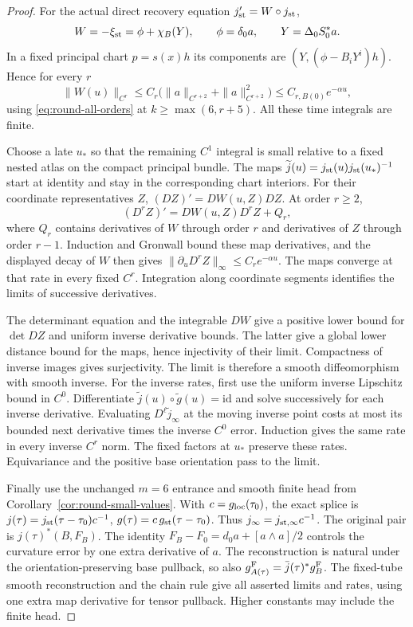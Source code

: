 \documentclass[11pt]{article}
\numberwithin{equation}{section}
\theoremstyle{definition}
\theoremstyle{remark}
\begin{document}
\begin{proof}
For the actual direct recovery equation
$j_{\rm st}'=W\circ j_{\rm st}$,
\[
 W=-\xi_{\rm st}=\phi+\chi_B(Y),\qquad
 \phi=\delta_0a,\qquad Y=\Delta_0S_0^*a.
\]
In a fixed principal chart $p=s(x)h$ its components are
$(Y,(\phi-B_iY^i)h)$. Hence for every $r$
\[
 \|W(u)\|_{C^r}\le C_r
 \bigl(\|a\|_{C^{r+2}}+\|a\|_{C^{r+2}}^2\bigr)
 \le C_{r,B(0)}e^{-\alpha u},
\]
using \eqref{eq:round-all-orders} at
$k\ge\max(6,r+5)$.
All these time integrals are finite.

Choose a late $u_*$ so that the remaining $C^1$
integral is small relative to a fixed nested atlas on
the compact principal bundle. The maps
$\widetilde j(u)=j_{\rm st}(u)j_{\rm st}(u_*)^{-1}$
start at identity and stay in the corresponding chart
interiors. For their coordinate representatives $Z$,
$(DZ)'=DW(u,Z)DZ$. At order $r\ge2$,
\[
 (D^rZ)'=DW(u,Z)D^rZ+Q_r,
\]
where $Q_r$ contains derivatives of $W$ through order
$r$ and derivatives of $Z$ through order $r-1$.
Induction and Gronwall bound these map derivatives,
and the displayed decay of $W$ then gives
$\|\partial_u D^rZ\|_\infty\le C_re^{-\alpha u}$.
The maps converge at that rate in every fixed $C^r$.
Integration along coordinate segments identifies the
limits of successive derivatives.

The determinant equation and the integrable $DW$
give a positive lower bound for $\det DZ$ and uniform
inverse derivative bounds. The latter give a global
lower distance bound for the maps, hence injectivity
of their limit. Compactness of inverse images gives
surjectivity. The limit is therefore a smooth
diffeomorphism with smooth inverse.
For the inverse rates, first use the uniform inverse
Lipschitz bound in $C^0$. Differentiate
$\widetilde j(u)\circ\widetilde g(u)=\mathrm{id}$
and solve successively for each inverse derivative.
Evaluating $D^\ell\widetilde j_\infty$ at the moving
inverse point costs at most its bounded next derivative
times the inverse $C^0$ error. Induction gives the same
rate in every inverse $C^r$ norm.
The fixed factors at $u_*$ preserve these rates.
Equivariance and the positive base orientation pass
to the limit.

Finally use the unchanged $m=6$ entrance and smooth
finite head from Corollary~\ref{cor:round-small-values}.
With $c=g_{\rm loc}(\tau_0)$, the exact splice is
$j(\tau)=j_{\rm st}(\tau-\tau_0)c^{-1}$,
$g(\tau)=c\,g_{\rm st}(\tau-\tau_0)$.
Thus $j_\infty=j_{{\rm st},\infty}c^{-1}$.
The original pair is $j(\tau)^*(B,F_B)$.
The identity $F_B-F_0=d_0a+[a\wedge a]/2$ controls
the curvature error by one extra derivative of $a$.
The reconstruction is natural under the
orientation-preserving base pullback, so also
$g^{\rm F}_{A(\tau)}=\bar j(\tau)^*g^{\rm F}_{B}$.
The fixed-tube smooth reconstruction and the chain
rule give all asserted limits and rates, using one
extra map derivative for tensor pullback.
Higher constants may include the finite head.
\end{proof}
\end{document}
